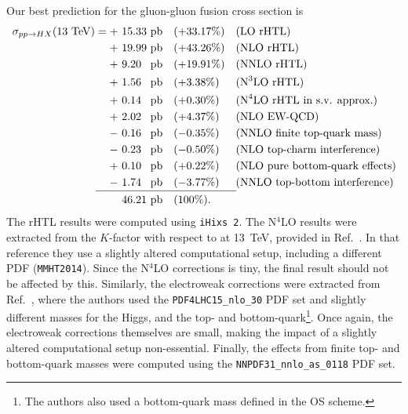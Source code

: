 Our best prediction for the gluon-gluon fusion cross section is
\begin{equation}
\begin{alignedat}{4}
\sigma_{pp \rightarrow HX} (13\ \mathrm{TeV}) = +\ & 15.33 \ &&\mathrm{pb    } && (+33.17\%) \quad  &&(\text{LO rHTL}) \\
+\ & 19.99\ &&\mathrm{pb} \quad && (+43.26\%)  &&(\text{NLO rHTL}) \\
+\ & 9.20\ &&\mathrm{pb} \quad && (+19.91\%) &&(\text{NNLO rHTL}) \\
+\ & 1.56\ &&\mathrm{pb} \quad && (+3.38\%) &&(\text{N}^3\text{LO rHTL}) \\
+\ & 0.14\ &&\mathrm{pb} \quad && (+0.30\%) &&(\text{N}^4 \text{LO rHTL in s.v. approx.}) \\
+\ & 2.02\ &&\mathrm{pb} \quad && (+4.37\%) &&(\text{NLO EW-QCD}) \\
-\ & 0.16\ &&\mathrm{pb} \quad && (-0.35\%) &&(\text{NNLO finite top-quark mass}) \\
-\ & 0.23\ &&\mathrm{pb} \quad && (-0.50\%) &&(\text{NLO top-charm interference}) \\
+\ & 0.10 \ &&\mathrm{pb}\quad && (+0.22\%) &&(\text{NLO pure bottom-quark effects}) \\
-\ & 1.74\ &&\mathrm{pb} \quad && (-3.77\%) &&(\text{NNLO top-bottom interference}) \\[-10pt]
& &&  \hspace{0.5cm} \mathclap{\rule{4.5cm}{0.4pt}}\\[-4pt]
& 46.21 \ &&\mathrm{pb} && (100\%).
\end{alignedat}
\end{equation}
The \acs{rHTL} results were computed using \texttt{iHixs 2}. The N${}^4$LO results were extracted from the $K$-factor with respect to \NNNLO at 13~TeV, provided in Ref.~\cite{Das:2020adl}. In that reference they use a slightly altered computational setup, including a different \acs{PDF} (\texttt{MMHT2014}). Since the N${}^4$LO corrections is tiny, the final result should not be affected by this. Similarly, the electroweak corrections were extracted from Ref.~\cite{Becchetti:2020wof}, where the authors used the \texttt{PDF4LHC15\_nlo\_30} PDF set and slightly different masses for the Higgs, and the top- and bottom-quark\footnote{The authors also used a bottom-quark mass defined in the \acs{OS} scheme.}. Once again, the electroweak corrections themselves are small, making the impact of a slightly altered computational setup non-essential. Finally, the effects from finite top- and bottom-quark masses were computed using the \texttt{NNPDF31\_nnlo\_as\_0118} PDF set.

